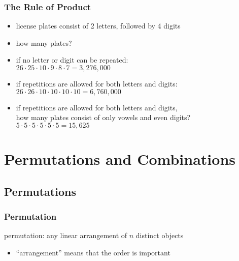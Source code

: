 \documentclass[dvipsnames]{beamer}
\begin{document}
\begin{frame}
  \frametitle{The Rule of Product}

  \begin{example}
    \begin{itemize}
      \item license plates consist of 2 letters, followed by 4 digits
      \item how many plates?

      \pause
      \medskip
      \item if no letter or digit can be repeated:\\
        $26 \cdot 25 \cdot 10 \cdot 9 \cdot 8 \cdot 7 = 3,276,000$

      \pause
      \medskip
      \item if repetitions are allowed for both letters and digits:\\
        $26 \cdot 26 \cdot 10 \cdot 10 \cdot 10 \cdot 10 = 6,760,000$

      \pause
      \medskip
      \item if repetitions are allowed for both letters and digits,\\
        how many plates consist of only vowels and even digits?\\
        $5 \cdot 5 \cdot 5 \cdot 5 \cdot 5 \cdot 5 = 15,625$
   \end{itemize}
  \end{example}
\end{frame}

\section{Permutations and Combinations}

\subsection{Permutations}

\begin{frame}
  \frametitle{Permutation}

  \begin{definition}
    \alert{permutation}: any linear arrangement of $n$ distinct objects
  \end{definition}

  \begin{itemize}
    \item ``arrangement'' means that the order is important
  \end{itemize}
\end{frame}
\end{document}
